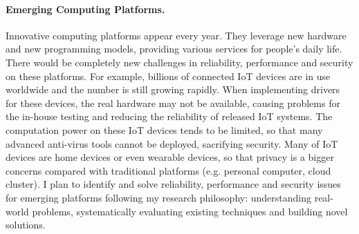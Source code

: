 \documentclass[10pt]{article}
\begin{document}
\paragraph{Emerging Computing Platforms.} 
Innovative computing platforms appear every year. 
They leverage new hardware and new programming models,
providing various services for people's daily life. 
There would be completely new challenges 
in reliability, performance and security on these platforms.
For example, billions of connected IoT devices are in use worldwide
and the number is still growing rapidly. 
When implementing drivers for these devices, 
the real hardware may not be available, 
causing problems for the in-house testing 
and reducing the reliability of released IoT systems. 
The computation power on these IoT devices tends to be limited, 
so that many advanced anti-virus tools cannot be deployed, sacrifying security. 
Many of IoT devices are home devices or even wearable devices,  
so that privacy is a bigger concerns compared 
with traditional platforms (e.g. personal computer, 
cloud cluster).
I plan to identify and solve reliability, performance and security issues 
for emerging platforms following my research philosophy:
understanding real-world problems, 
systematically evaluating existing techniques
and building novel solutions. 




\newpage


\end{document}
